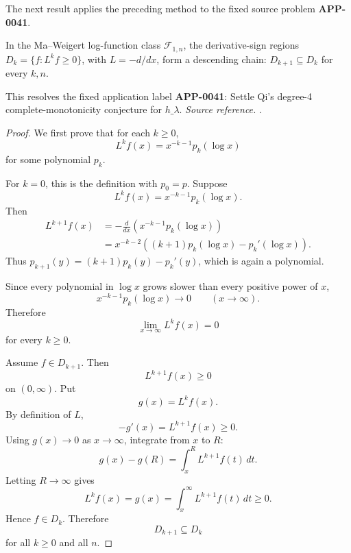 The next result applies the preceding method to the fixed source problem \textbf{APP-0041}.
\begin{corollary}
\label{res:ma-weigert-log-function-dk-chain-conjecture}
In the Ma--Weigert log-function class \(\mathcal F_{1,n}\), the derivative-sign regions \(D_k=\{f:L^k f\ge0\}\), with \(L=-d/dx\), form a descending chain: \(D_{k+1}\subseteq D_k\) for every \(k,n\).

This resolves the fixed application label \textbf{APP-0041}: Settle Qi's degree-4 complete-monotonicity conjecture for \(h\_\lambda\).
\emph{Source reference.} \cite{app-app-0041-source}.
\end{corollary}
\begin{proof}
We first prove that for each \(k\ge0\),
\[
L^k f(x)=x^{-k-1}p_k(\log x)
\]
for some polynomial \(p_k\).

For \(k=0\), this is the definition with \(p_0=p\).  Suppose
\[
L^k f(x)=x^{-k-1}p_k(\log x).
\]
Then
\[
\begin{aligned}
L^{k+1}f(x)
&=-\frac{d}{dx}\left(x^{-k-1}p_k(\log x)\right)\\
&=x^{-k-2}\left((k+1)p_k(\log x)-p_k'(\log x)\right).
\end{aligned}
\]
Thus \(p_{k+1}(y)=(k+1)p_k(y)-p_k'(y)\), which is again a polynomial.

Since every polynomial in \(\log x\) grows slower than every positive power of \(x\),
\[
x^{-k-1}p_k(\log x)\to0
\qquad (x\to\infty).
\]
Therefore
\[
\lim_{x\to\infty}L^k f(x)=0
\]
for every \(k\ge0\).

Assume \(f\in D_{k+1}\).  Then
\[
L^{k+1}f(x)\ge0
\]
on \((0,\infty)\).  Put
\[
g(x)=L^k f(x).
\]
By definition of \(L\),
\[
-g'(x)=L^{k+1}f(x)\ge0.
\]
Using \(g(x)\to0\) as \(x\to\infty\), integrate from \(x\) to \(R\):
\[
g(x)-g(R)=\int_x^R L^{k+1}f(t)\,dt.
\]
Letting \(R\to\infty\) gives
\[
L^k f(x)=g(x)=\int_x^\infty L^{k+1}f(t)\,dt\ge0.
\]
Hence \(f\in D_k\).  Therefore
\[
D_{k+1}\subseteq D_k
\]
for all \(k\ge0\) and all \(n\).
\end{proof}

